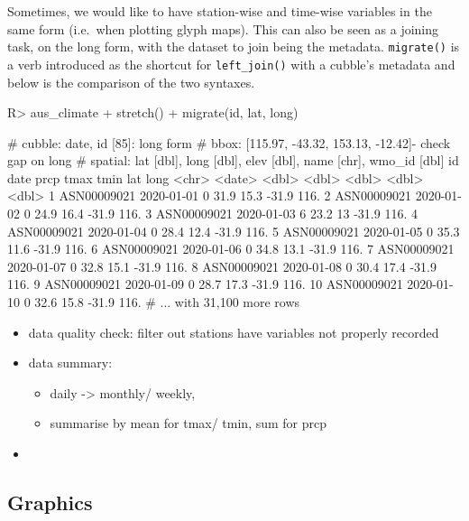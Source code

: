 \documentclass[
]{jss}
\providecommand{\tightlist}{%
  \setlength{\itemsep}{0pt}\setlength{\parskip}{0pt}}
\begin{document}
Sometimes, we would like to have station-wise and time-wise variables in
the same form (i.e.~when plotting glyph maps). This can also be seen as
a joining task, on the long form, with the dataset to join being the
metadata. \texttt{migrate()} is a verb introduced as the shortcut for
\texttt{left\_join()} with a cubble's metadata and below is the
comparison of the two syntaxes.

\begin{CodeChunk}
\begin{CodeInput}
R> aus_climate %
+   stretch() %
+   migrate(id, lat, long)
\end{CodeInput}
\begin{CodeOutput}
# cubble:  date, id [85]: long form
# bbox:    [115.97, -43.32, 153.13, -12.42]- check gap on long
# spatial: lat [dbl], long [dbl], elev [dbl], name [chr], wmo_id [dbl]
   id          date        prcp  tmax  tmin   lat  long
   <chr>       <date>     <dbl> <dbl> <dbl> <dbl> <dbl>
 1 ASN00009021 2020-01-01     0  31.9  15.3 -31.9  116.
 2 ASN00009021 2020-01-02     0  24.9  16.4 -31.9  116.
 3 ASN00009021 2020-01-03     6  23.2  13   -31.9  116.
 4 ASN00009021 2020-01-04     0  28.4  12.4 -31.9  116.
 5 ASN00009021 2020-01-05     0  35.3  11.6 -31.9  116.
 6 ASN00009021 2020-01-06     0  34.8  13.1 -31.9  116.
 7 ASN00009021 2020-01-07     0  32.8  15.1 -31.9  116.
 8 ASN00009021 2020-01-08     0  30.4  17.4 -31.9  116.
 9 ASN00009021 2020-01-09     0  28.7  17.3 -31.9  116.
10 ASN00009021 2020-01-10     0  32.6  15.8 -31.9  116.
# ... with 31,100 more rows
\end{CodeOutput}
\end{CodeChunk}

\begin{itemize}
\tightlist
\item
  data quality check: filter out stations have variables not properly
  recorded
\item
  data summary:

  \begin{itemize}
  \tightlist
  \item
    daily -\textgreater{} monthly/ weekly,
  \item
    summarise by mean for tmax/ tmin, sum for prcp
  \end{itemize}
\item
\end{itemize}

\hypertarget{graphics}{%
\subsection{Graphics}\label{graphics}}
\end{document}
